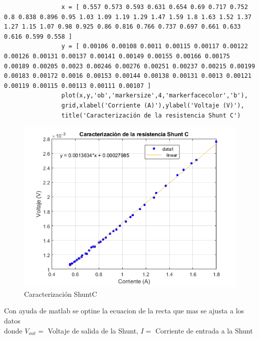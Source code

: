             \begin{lstlisting}
                x = [ 0.557 0.573 0.593 0.631 0.654 0.69 0.717 0.752 0.8 0.838 0.896 0.95 1.03 1.09 1.19 1.29 1.47 1.59 1.8 1.63 1.52 1.37 1.27 1.15 1.07 0.98 0.925 0.86 0.816 0.766 0.737 0.697 0.661 0.633 0.616 0.599 0.558 ]
                y = [ 0.00106 0.00108 0.0011 0.00115 0.00117 0.00122 0.00126 0.00131 0.00137 0.00141 0.00149 0.00155 0.00166 0.00175 0.00189 0.00205 0.0023 0.00246 0.00276 0.00251 0.00237 0.00215 0.00199 0.00183 0.00172 0.0016 0.00153 0.00144 0.00138 0.00131 0.0013 0.00121 0.00119 0.00115 0.00113 0.00111 0.00107 ]
                plot(x,y,'ob','markersize',4,'markerfacecolor','b'),
                grid,xlabel('Corriente (A)'),ylabel('Voltaje (V)'),
                title('Caracterización de la resistencia Shunt C')
            \end{lstlisting}


            \begin{figure}[H]
                \begin{center}
                    \includegraphics[width = 15cm]{3Proyecto/CorrienteVoltaje3.png}
                    \caption{ Caracterización ShuntC} 
                    \label{fig:Muestras shuntC}
                \end{center}
            \end{figure}
            
            Con ayuda de matlab se optine la ecuacion de la recta que mas se ajusta a los datos\\
            donde $V_{out}=$ Voltaje de salida de la Shunt, $I=$ Corriente de entrada a la Shunt 

